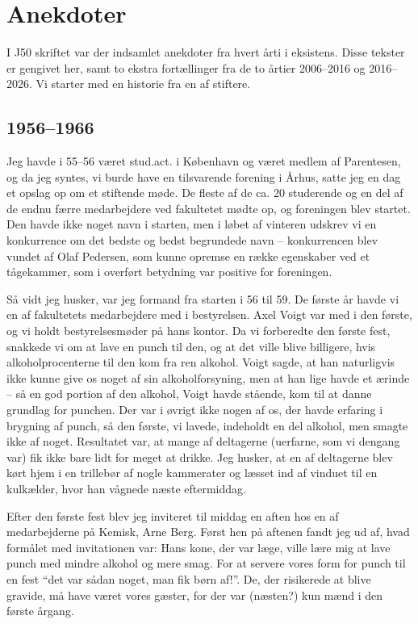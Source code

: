 \section{Anekdoter}
I J50 skriftet var der indsamlet anekdoter fra hvert årti i \TKETs eksistens. Disse tekster er gengivet her, samt to ekstra fortællinger fra de to årtier 2006--2016 og 2016--2026. Vi starter med en historie fra en af \TKETs stiftere.

\subsection{1956--1966}

Jeg havde i 55--56 været stud.act. i København og været medlem af Parentesen, og da jeg syntes, vi burde have en tilsvarende forening i Århus, satte jeg en dag et opslag op om et stiftende møde. De fleste af de ca. 20 studerende og en del af de endnu færre medarbejdere ved fakultetet mødte op, og foreningen blev startet. Den havde ikke noget navn i starten, men i løbet af vinteren udskrev vi en konkurrence om det bedste og bedst begrundede navn -- konkurrencen blev vundet af Olaf Pedersen, som kunne opremse en række egenskaber ved et tågekammer, som i overført betydning var positive for foreningen.

Så vidt jeg husker, var jeg formand fra starten i 56 til 59. De første år havde vi en af fakultetets medarbejdere med i bestyrelsen. Axel Voigt var med i den første, og vi holdt bestyrelsesmøder på hans kontor. Da vi forberedte den første fest, snakkede vi om at lave en punch til den, og at det ville blive billigere, hvis alkoholprocenterne til den kom fra ren alkohol. Voigt sagde, at han naturligvis ikke kunne give os noget af sin alkoholforsyning, men at han lige havde et ærinde -- så en god portion af den alkohol, Voigt havde stående, kom til at danne grundlag for punchen. Der var i øvrigt ikke nogen af os, der havde erfaring i brygning af punch, så den første, vi lavede, indeholdt en del alkohol, men smagte ikke af noget. Resultatet var, at mange af deltagerne (uerfarne, som vi dengang var) fik ikke bare lidt for meget at drikke. Jeg husker, at en af deltagerne blev kørt hjem i en trillebør af nogle kammerater og læsset ind af vinduet til en kulkælder, hvor han vågnede næste eftermiddag.

Efter den første fest blev jeg inviteret til middag en aften hos en af medarbejderne på Kemisk, Arne Berg. Først hen på aftenen fandt jeg ud af, hvad formålet med invitationen var: Hans kone, der var læge, ville lære mig at lave punch med mindre alkohol og mere smag. For at servere vores form for punch til en fest ``det var sådan noget, man fik børn af!''. De, der risikerede at blive gravide, må have været vores gæster, for der var (næsten?) kun mænd i den første årgang.

